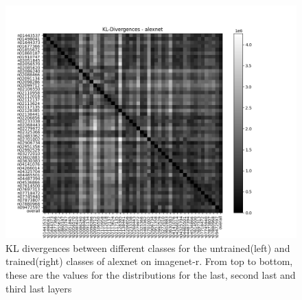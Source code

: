 \documentclass{article}
\begin{document}
\begin{figure}[H]
\begin{minipage}{0.45\textwidth}
        \end{minipage}\hfill
        \begin{minipage}{0.45\textwidth}
            \centering
            \includegraphics[width=\textwidth]{images/alexnet_kl_matrix_r_2.png} %
        \end{minipage}
        
        \caption{KL divergences between different classes for the untrained(left) and trained(right) classes of alexnet on imagenet-r. From top to bottom, these are the values for the distributions for the last, second last and third last layers}
        \label{fig:kl_divergences_r}

    \end{figure}
    
\end{document}
